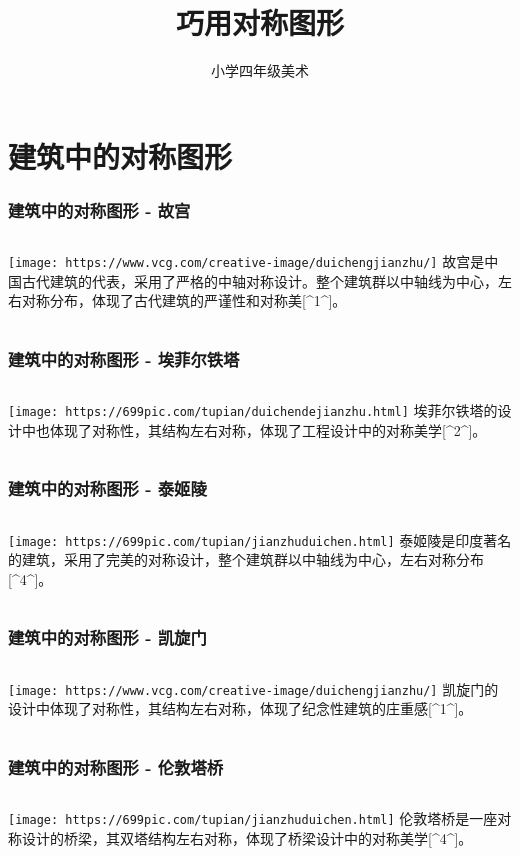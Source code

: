 \documentclass{ctexbeamer}
\title{巧用对称图形}
\author{小学四年级美术}
\date{}
\begin{document}
\begin{frame}
\titlepage
\end{frame}

\section{建筑中的对称图形}

\begin{frame}
\frametitle{建筑中的对称图形 - 故宫}
\begin{columns}
\texttt{[image: https://www.vcg.com/creative-image/duichengjianzhu/]}
故宫是中国古代建筑的代表，采用了严格的中轴对称设计。整个建筑群以中轴线为中心，左右对称分布，体现了古代建筑的严谨性和对称美[^1^]。
\end{columns}
\end{frame}

\begin{frame}
\frametitle{建筑中的对称图形 - 埃菲尔铁塔}
\begin{columns}
\texttt{[image: https://699pic.com/tupian/duichendejianzhu.html]}
埃菲尔铁塔的设计中也体现了对称性，其结构左右对称，体现了工程设计中的对称美学[^2^]。
\end{columns}
\end{frame}

\begin{frame}
\frametitle{建筑中的对称图形 - 泰姬陵}
\begin{columns}
\texttt{[image: https://699pic.com/tupian/jianzhuduichen.html]}
泰姬陵是印度著名的建筑，采用了完美的对称设计，整个建筑群以中轴线为中心，左右对称分布[^4^]。
\end{columns}
\end{frame}

\begin{frame}
\frametitle{建筑中的对称图形 - 凯旋门}
\begin{columns}
\texttt{[image: https://www.vcg.com/creative-image/duichengjianzhu/]}
凯旋门的设计中体现了对称性，其结构左右对称，体现了纪念性建筑的庄重感[^1^]。
\end{columns}
\end{frame}

\begin{frame}
\frametitle{建筑中的对称图形 - 伦敦塔桥}
\begin{columns}
\texttt{[image: https://699pic.com/tupian/jianzhuduichen.html]}
伦敦塔桥是一座对称设计的桥梁，其双塔结构左右对称，体现了桥梁设计中的对称美学[^4^]。
\end{columns}
\end{frame}
\end{document}
